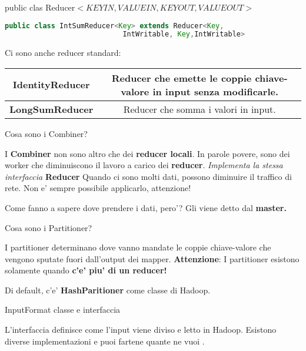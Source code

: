 public clas Reducer$<KEYIN,VALUEIN,KEYOUT,VALUEOUT>$

\begin{lstlisting}[language=Java]
    public class IntSumReducer<Key> extends Reducer<Key,
                            IntWritable, Key,IntWritable>
\end{lstlisting}

Ci sono anche reducer standard:
\begin{table}[H]
    \begin{center}
        \begin{tabular}{|c|c|}
            \hline
            \textbf{IdentityReducer} & Reducer che emette le coppie chiave-valore in input senza modificarle. \\
            \hline
            \textbf{LongSumReducer}  & Reducer che somma i valori in input.                                   \\
            \hline
        \end{tabular}
    \end{center}
\end{table}

\begin{domanda}
    Cosa sono i Combiner?
\end{domanda}

I \textbf{Combiner} non sono altro che dei \textbf{reducer locali}. In parole
povere, sono dei worker che diminuiscono il lavoro a carico dei
\textbf{reducer}. \textit{Implementa la stessa interfaccia} \textbf{Reducer}
Quando ci sono molti dati, possono diminuire il traffico di rete. Non e' sempre
possibile applicarlo, attenzione!

Come fanno a sapere dove prendere i dati, pero'? Gli viene detto dal
\textbf{master.}

\begin{domanda}
    Cosa sono i Partitioner?
\end{domanda}

I partitioner determinano dove vanno mandate le coppie chiave-valore che
vengono sputate fuori dall'output dei mapper. \textbf{Attenzione}: I
partitioner esistono solamente quando \textbf{c'e' piu' di un reducer!}

Di default, c'e' \textbf{HashParitioner} come classe di Hadoop.

\begin{domanda}
    InputFormat classe e interfaccia
\end{domanda}

L'interfaccia definisce come l'input viene diviso e letto in Hadoop. Esistono
diverse implementazioni e puoi fartene quante ne vuoi .

